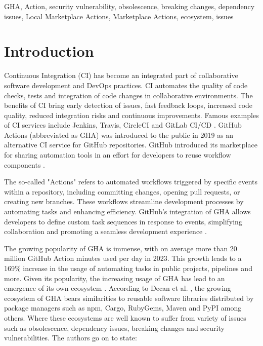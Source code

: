 \documentclass[conference]{IEEEtran}
\begin{document}
\begin{IEEEkeywords}
GHA, Action, security vulnerability, obsolescence, breaking changes, dependency issues, Local Marketplace Actions, Marketplace Actions, ecosystem, issues
\end{IEEEkeywords}

\section{Introduction}

    Continuous Integration (CI) has become an integrated part of collaborative software development and DevOps practices. CI automates the quality of code checks, tests and integration of code changes in collaborative environments. The benefits of CI bring early detection of issues, fast feedback loops, increased code quality, reduced integration risks and continuous improvements. Famous examples of CI services include Jenkins, Travis, CircleCI and GitLab CI/CD \cite{dabbish2012social}. GitHub Actions (abbreviated as GHA) was introduced to the public in 2019 as an alternative CI service for GitHub repositories. GitHub introduced its marketplace for sharing automation tools in an effort for developers to reuse workflow components \cite{saroar2023developers}. 
 
    The so-called "Actions" refers to automated workflows triggered by specific events within a repository, including committing changes, opening pull requests, or creating new branches. These workflows streamline development processes by automating tasks and enhancing efficiency. GitHub's integration of GHA allows developers to define custom task sequences in response to events, simplifying collaboration and promoting a seamless development experience \cite{chandrasekara2021getting}. 


    The growing popularity of GHA is immense, with on average more than 20 million GitHub Action minutes used per day in 2023. This growth leads to a 169\% increase in the usage of automating tasks in public projects,  pipelines and more\cite{github2023octoverse}. Given its popularity,  the increasing usage of GHA has lead to an emergence of its own ecosystem \cite{decan2022use}.  According to Decan et al. \cite{decan2022use}, the growing ecosystem of GHA bears similarities to reusable software libraries distributed by package managers such as npm, Cargo, RubyGems, Maven and PyPI among others. Where these ecosystems are well known to suffer from variety of issues such as obsolescence, dependency issues, breaking changes and security vulnerabilities\cite{decan2022use}. The authors go on to state:\\
\end{document}
